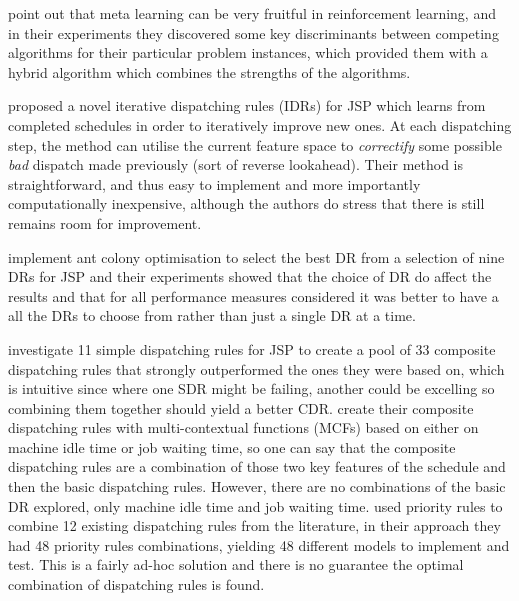 \documentclass[smallextended]{svjour3}
\begin{document}
\citet{Kalyanakrishnan11} point out that meta learning can be very fruitful in reinforcement learning, and in their experiments they discovered some key discriminants between competing algorithms for their particular problem instances, which provided them with a hybrid algorithm which combines the strengths of the algorithms.

\citet{Nguyen13} proposed a novel iterative dispatching rules (IDRs) for JSP which learns from completed schedules in order to iteratively improve new ones. At each dispatching step, the method can utilise the current feature space to \emph{correctify} some possible \emph{bad} dispatch made previously (sort of reverse lookahead).
Their method is straightforward, and thus easy to implement and more importantly computationally inexpensive, although the authors do stress that there is still remains room for improvement. 

\citet{Korytkowski13} implement ant colony optimisation to select the best DR from a selection of nine DRs for JSP and their experiments showed that the choice of DR do affect the results and that for all performance measures considered it was better to have a all the DRs to choose from rather than just a single DR at a time. 

\citet{Lu13} investigate 11 simple dispatching rules for JSP to create a pool of 33 composite dispatching rules that strongly outperformed the ones they were based on, which is intuitive since where one SDR might be failing, another could be excelling so combining them together should yield a better CDR. \citet{Lu13} create their composite dispatching rules with multi-contextual functions (MCFs) based on either on machine idle time or job waiting time, so one can say that the composite dispatching rules are a combination of those two key features of the schedule and then the basic dispatching rules. However, there are no combinations of the basic DR explored, only machine idle time and job waiting time.  
\citet{Yu13} used priority rules to combine 12 existing dispatching rules from the literature, in their approach they had 48 priority rules combinations, yielding 48 different models to implement and test. This is a fairly ad-hoc solution and there is no guarantee the optimal combination of dispatching rules is found. 


\end{document}
